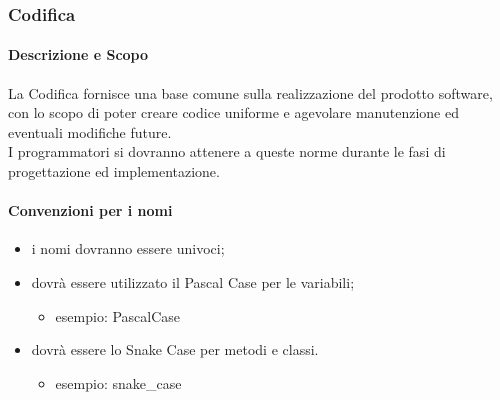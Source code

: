 	\subsubsection{Codifica} 
		\paragraph{Descrizione e Scopo} \hfill \break
		La Codifica fornisce una base comune sulla realizzazione del prodotto software, con lo scopo di poter creare codice uniforme e agevolare manutenzione ed eventuali modifiche future. \\
		I programmatori si dovranno attenere a queste norme durante le fasi di progettazione ed implementazione. 
			
		\paragraph{Convenzioni per i nomi} 
		\begin{itemize}
			\item i nomi dovranno essere univoci;
			\item dovrà essere utilizzato il Pascal Case per le variabili;
        \begin{itemize}
          \item esempio: PascalCase
        \end{itemize}
			\item dovrà essere lo Snake Case per metodi e classi. 
        \begin{itemize}
          \item esempio: snake\_case
        \end{itemize}
		\end{itemize}
			
